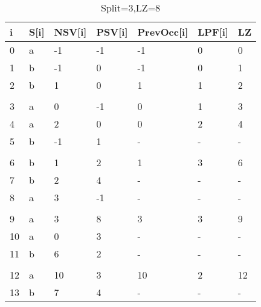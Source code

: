 \begin{table}[h]
\begin{tabular}{@{}lllllll@{}}
\toprule
i  & S{[}i{]} & NSV{[}i{]} & PSV{[}i{]} & PrevOcc{[}i{]} & LPF{[}i{]} & LZ \\ \midrule
0  & a        & -1         & -1         & -1             & 0          & 0  \\
1  & b        & -1         & 0          & -1             & 0          & 1  \\
2  & b        & 1          & 0          & 1              & 1          & 2  \\
   &          &            &            &                &            &    \\
3  & a        & 0          & -1         & 0              & 1          & 3  \\
4  & a        & 2          & 0          & 0              & 2          & 4  \\
5  & b        & -1         & 1          & -              & -          & -  \\
   &          &            &            &                &            &    \\
6  & b        & 1          & 2          & 1              & 3          & 6  \\
7  & b        & 2          & 4          & -              & -          & -  \\
8  & a        & 3          & -1         & -              & -          & -  \\
   &          &            &            &                &            &    \\
9  & a        & 3          & 8          & 3              & 3          & 9  \\
10 & a        & 0          & 3          & -              & -          & -  \\
11 & b        & 6          & 2          & -              & -          & -  \\
   &          &            &            &                &            &    \\
12 & a        & 10         & 3          & 10             & 2          & 12 \\
13 & b        & 7          & 4          & -              & -          & -  \\ \bottomrule
\end{tabular}
\label{my-label}
\caption{Split=3,LZ=8}
\end{table}

